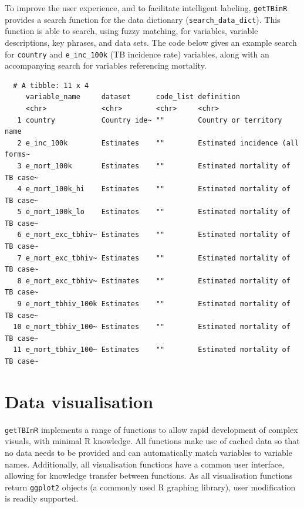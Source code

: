 \documentclass[11pt,twoside]{bristolthesis}
\begin{document}
  To improve the user experience, and to facilitate intelligent labeling, \texttt{getTBinR} provides a search function for the data dictionary (\texttt{search\_data\_dict}). This function is able to search, using fuzzy matching, for variables, variable descriptions, key phrases, and data sets. The code below gives an example search for \texttt{country} and \texttt{e\_inc\_100k} (TB incidence rate) variables, along with an accompanying search for variables referencing mortality.
  \begin{Shaded}
  \begin{Highlighting}[]
  \NormalTok{(} \NormalTok{(}\NormalTok{,}\NormalTok{),}
                    \NormalTok{(}\NormalTok{), } \NormalTok{)}
  \end{Highlighting}
  \end{Shaded}
  \begin{verbatim}
  # A tibble: 11 x 4
     variable_name     dataset      code_list definition                     
     <chr>             <chr>        <chr>     <chr>                          
   1 country           Country ide~ ""        Country or territory name      
   2 e_inc_100k        Estimates    ""        Estimated incidence (all forms~
   3 e_mort_100k       Estimates    ""        Estimated mortality of TB case~
   4 e_mort_100k_hi    Estimates    ""        Estimated mortality of TB case~
   5 e_mort_100k_lo    Estimates    ""        Estimated mortality of TB case~
   6 e_mort_exc_tbhiv~ Estimates    ""        Estimated mortality of TB case~
   7 e_mort_exc_tbhiv~ Estimates    ""        Estimated mortality of TB case~
   8 e_mort_exc_tbhiv~ Estimates    ""        Estimated mortality of TB case~
   9 e_mort_tbhiv_100k Estimates    ""        Estimated mortality of TB case~
  10 e_mort_tbhiv_100~ Estimates    ""        Estimated mortality of TB case~
  11 e_mort_tbhiv_100~ Estimates    ""        Estimated mortality of TB case~
  \end{verbatim}
  \hypertarget{getbinr-vis}{%
  \section{Data visualisation}\label{getbinr-vis}}
  
  \texttt{getTBInR} implements a range of functions to allow rapid development of complex visuals, with minimal R knowledge. All functions make use of cached data so that no data needs to be provided and can automatically match variables to variable names. Additionally, all visualisation functions have a common user interface, allowing for knowledge transfer between functions. As all visualisation functions return \texttt{ggplot2} objects (a commonly used R graphing library), user modification is readily supported.
  
\end{document}
